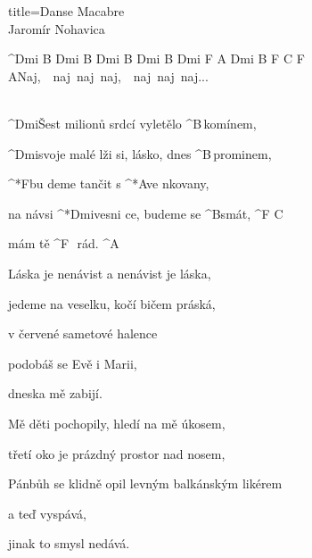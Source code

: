 \begin{song}{title=\predtitle\centering Danse Macabre \\\large Jaromír Nohavica \vspace*{-0.3cm}}  %
\begin{centerjustified}
\nejnejvetsi

^{Dmi B Dmi B Dmi B Dmi B Dmi F A Dmi B F C F A\z}Naj,~~naj~naj~naj,~~naj~naj~naj\elipsa.\elipsa.\elipsa.~~~~~~~~~~~~~~~~~~~~~~~~~~~~~~~~~~~~~~~~~~~

\sloka
	^{Dmi}Šest milionů srdcí vyletělo ^{\z B\,}komínem,

	^{Dmi}svoje malé lži si, lásko, dnes ^{\z B\,}prominem,

	^*{F}bu deme tančit s ^*{A}ve nkovany,

	na návsi ^*{Dmi}vesni ce, budeme se ^{B\z }smát, ^{F\,\,C}

	mám tě ^{F\,\,\,\,}rád. ^{A}


\sloka
	Láska je nenávist a nenávist je láska,

	jedeme na veselku, kočí bičem práská,

	v červené sametové halence

	podobáš se Evě i Marii,

	dneska mě zabijí.


\sloka
	Mě děti pochopily, hledí na mě úkosem,

	třetí oko je prázdný prostor nad nosem,

	Pánbůh se klidně opil levným balkánským likérem

	a teď vyspává,

	jinak to smysl nedává.

\end{centerjustified}
\setcounter{Slokočet}{0}
\end{song}
